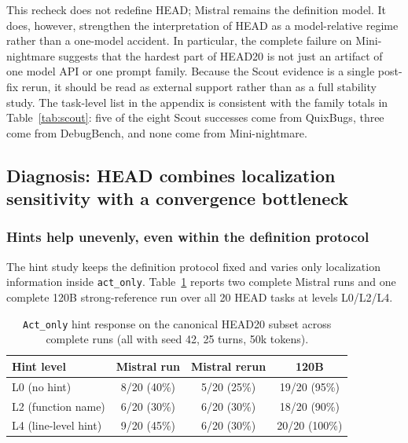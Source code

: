 \documentclass{article}
\begin{document}
This recheck does not redefine HEAD; Mistral remains the definition model. It does, however, strengthen the interpretation of HEAD as a model-relative regime rather than a one-model accident. In particular, the complete failure on Mini-nightmare suggests that the hardest part of HEAD20 is not just an artifact of one model API or one prompt family. Because the Scout evidence is a single post-fix rerun, it should be read as external support rather than as a full stability study. The task-level list in the appendix is consistent with the family totals in Table~\ref{tab:scout}: five of the eight Scout successes come from QuixBugs, three come from DebugBench, and none come from Mini-nightmare.

\subsection{Diagnosis: HEAD combines localization sensitivity with a convergence bottleneck}

\subsubsection{Hints help unevenly, even within the definition protocol}

The hint study keeps the definition protocol fixed and varies only localization information inside \texttt{act\_only}. Table~\ref{tab:hints} reports two complete Mistral runs and one complete 120B strong-reference run over all 20 HEAD tasks at levels L0/L2/L4.

\begin{table}[t]
\centering
\caption{\texttt{Act\_only} hint response on the canonical HEAD20 subset across complete runs (all with seed 42, 25 turns, 50k tokens).}
\label{tab:hints}
\begin{tabular}{lccc}
\toprule
Hint level & Mistral run & Mistral rerun & 120B \\
\midrule
L0 (no hint) & 8/20 (40\%) & 5/20 (25\%) & 19/20 (95\%) \\
L2 (function name) & 6/20 (30\%) & 6/20 (30\%) & 18/20 (90\%) \\
L4 (line-level hint) & 9/20 (45\%) & 6/20 (30\%) & 20/20 (100\%) \\
\bottomrule
\end{tabular}
\end{table}
\end{document}
